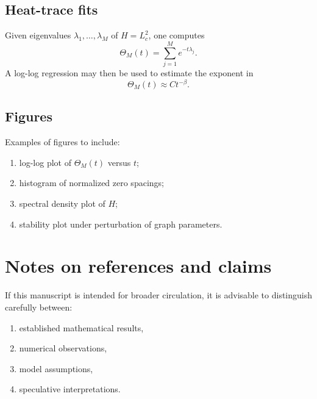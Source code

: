 \documentclass[11pt,a4paper]{amsart}
\theoremstyle{plain}
\theoremstyle{definition}
\theoremstyle{remark}
\newcommand{\ThetaH}{\Theta}
\newcommand{\Lc}{L_c}
\begin{document}
	\subsection{Heat-trace fits}
	
	Given eigenvalues \(\lambda_1,\dots,\lambda_M\) of \(H=\Lc^2\), one computes
	\[
	\ThetaH_M(t)=\sum_{j=1}^M e^{-t\lambda_j}.
	\]
	A log-log regression may then be used to estimate the exponent in
	\[
	\ThetaH_M(t)\approx C t^{-\beta}.
	\]
	
	\subsection{Figures}
	
	Examples of figures to include:
	\begin{enumerate}[label=\arabic*.]
		\item log-log plot of \(\ThetaH_M(t)\) versus \(t\);
		\item histogram of normalized zero spacings;
		\item spectral density plot of \(H\);
		\item stability plot under perturbation of graph parameters.
	\end{enumerate}
	
	\section{Notes on references and claims}
	
	If this manuscript is intended for broader circulation, it is advisable to distinguish carefully between:
	\begin{enumerate}[label=\arabic*.]
		\item established mathematical results,
		\item numerical observations,
		\item model assumptions,
		\item speculative interpretations.
	\end{enumerate}
	
\end{document}
